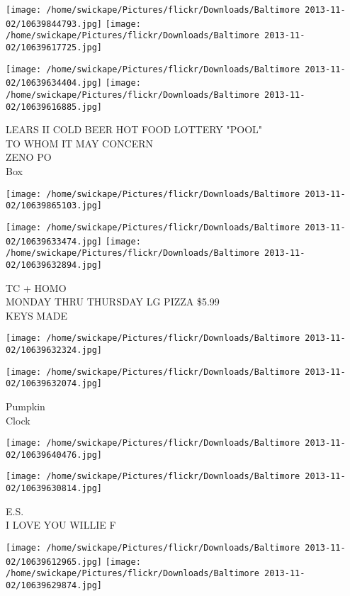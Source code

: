 \documentclass[10pt,letterpaper]{article}
\begin{document}
\texttt{[image: /home/swickape/Pictures/flickr/Downloads/Baltimore 2013-11-02/10639844793.jpg]}
\texttt{[image: /home/swickape/Pictures/flickr/Downloads/Baltimore 2013-11-02/10639617725.jpg]}

\texttt{[image: /home/swickape/Pictures/flickr/Downloads/Baltimore 2013-11-02/10639634404.jpg]}
\texttt{[image: /home/swickape/Pictures/flickr/Downloads/Baltimore 2013-11-02/10639616885.jpg]}

LEARS II COLD BEER HOT FOOD LOTTERY "POOL"\\
TO WHOM IT MAY CONCERN\\
ZENO PO\\
Box\\
\pagebreak

\texttt{[image: /home/swickape/Pictures/flickr/Downloads/Baltimore 2013-11-02/10639865103.jpg]}

\vspace{0.25in}
\texttt{[image: /home/swickape/Pictures/flickr/Downloads/Baltimore 2013-11-02/10639633474.jpg]}
\texttt{[image: /home/swickape/Pictures/flickr/Downloads/Baltimore 2013-11-02/10639632894.jpg]}

TC + HOMO\\
MONDAY THRU THURSDAY LG PIZZA \$5.99\\
KEYS MADE\\
\pagebreak

\texttt{[image: /home/swickape/Pictures/flickr/Downloads/Baltimore 2013-11-02/10639632324.jpg]}

\vspace{0.25in}
\texttt{[image: /home/swickape/Pictures/flickr/Downloads/Baltimore 2013-11-02/10639632074.jpg]}

Pumpkin\\
Clock\\
\pagebreak

\texttt{[image: /home/swickape/Pictures/flickr/Downloads/Baltimore 2013-11-02/10639640476.jpg]}

\vspace{0.25in}
\texttt{[image: /home/swickape/Pictures/flickr/Downloads/Baltimore 2013-11-02/10639630814.jpg]}

E.S.\\
I LOVE YOU WILLIE F\\
\pagebreak

\texttt{[image: /home/swickape/Pictures/flickr/Downloads/Baltimore 2013-11-02/10639612965.jpg]}
\texttt{[image: /home/swickape/Pictures/flickr/Downloads/Baltimore 2013-11-02/10639629874.jpg]}
\end{document}
